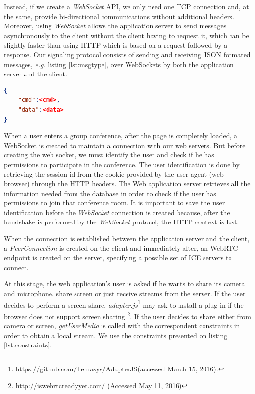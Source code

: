 Instead, if we create a \emph{WebSocket} \ac{API}, we only need one \ac{TCP} connection and, at the same, provide bi-directional communications without additional headers. Moreover, using \emph{WebSocket} allows the application server to send messages asynchronously to the client without the client having to request it, which can be slightly faster than using \ac{HTTP} which is based on a request followed by a response.
Our signaling protocol consists of sending and receiving \ac{JSON} formated messages, \emph{e.g.} listing \ref{lst:msgtype}, over WebSockets by both the application server and the client. 

\begin{minipage}{\linewidth}
\begin{lstlisting}[caption={General structure of our WebSocket messages},label={lst:msgtype},language=json]
{
	"cmd":<cmd>,
	"data":<data>
}
\end{lstlisting}
\end{minipage}

When a user enters a group conference, after the page is completely loaded, a WebSocket is created to maintain a connection with our web servers. 
But before creating the web socket, we must identify the user and check if he has permissions to participate in the conference. The user identification is done by retrieving the session id from the cookie provided by the user-agent (web browser) through the \ac{HTTP} headers.
The Web application server retrieves all the information needed from the database in order to check if the user has permissions to join that conference room. It is important to save the user identification before the \emph{WebSocket} connection is created because, after the handshake is performed by the \emph{WebSocket} protocol\cite{rfc6455}, the \ac{HTTP} context is lost.

When the connection is established between the application server and the client, a \emph{PeerConnection} is created on the client and immediately after, an \ac{WebRTC} endpoint is created on the server, specifying a possible set of \ac{ICE} servers to connect.

At this stage, the web application's user is asked if he wants to share its camera and microphone, share screen or just receive streams from the server. If the user decides to perform a screen share, \emph{adapter.js}\footnote{\url{https://github.com/Temasys/AdapterJS}(accessed March 15, 2016).} may ask to install a plug-in if the browser does not support screen sharing \footnote{\url{http://iswebrtcreadyyet.com/} (Accessed May 11, 2016)}.
If the user decides to share either from camera or screen, \emph{getUserMedia} is called with the correspondent constraints in order to obtain a local stream. We use the constraints presented on listing \ref{lst:constraints}. 

